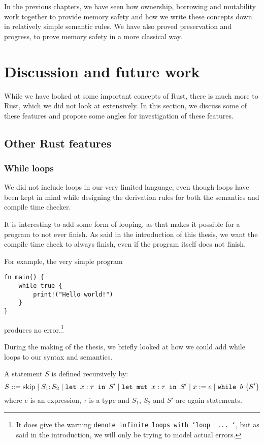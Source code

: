 In the previous chapters, we have seen how ownership, borrowing and mutability work together to provide memory safety and how we write these concepts down in relatively simple semantic rules. We have also proved preservation and progress, to prove memory safety in a more classical way. 

\section[discussion]{Discussion and future work}
While we have looked at some important concepts of Rust, there is much more to Rust, which we did not look at extensively. In this section, we discuss some of these features and propose some angles for investigation of these features.

\subsection{Other Rust features}

\subsubsection*{While loops}
We did not include loops in our very limited language, even though loops have been kept in mind while designing the derivation rules for both the semantics and compile time checker. 

It is interesting to add some form of looping, as that makes it possible for a program to not ever finish. As said in the introduction of this thesis, we want the compile time check to always finish, even if the program itself does not finish. 

For example, the very simple program 

\begin{verbatim}
fn main() {
    while true {
        print!("Hello world!")
    }
}
\end{verbatim}

produces no error.\footnote{It does give the warning \texttt{denote infinite loops with `loop { ... }`}, but as said in the introduction, we will only be trying to model actual errors.}

During the making of the thesis, we briefly looked at how we could add while loops to our syntax and semantics. 

\begin{definition}
\label{statementswhile}
A statement $S$ is defined recursively by:
$$S ::= \textrm{skip} \mid S_1; S_2 \mid \texttt{let }x : \tau \texttt{ in } S' \mid \texttt{let mut }x : \tau \texttt{ in } S' \mid x := e \mid \texttt{while } b~ \{ S' \}$$
where $e$ is an expression, $\tau$ is a type and $S_1$, $S_2$ and $S'$ are again statements.
\end{definition}

